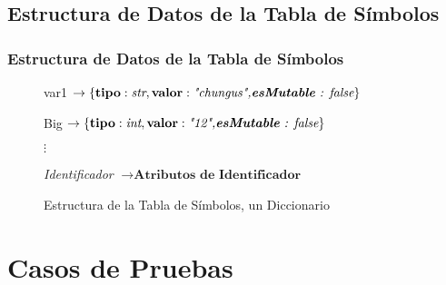 \documentclass[14pt, aspectratio=169]{beamer}
\begin{document}
\subsection{Estructura de Datos de la Tabla de Símbolos}

\begin{frame}
    \frametitle{Estructura de Datos de la Tabla de Símbolos}
    \begin{figure}[H]
        \begin{mdframed}
            \textnormal{var1} $\rightarrow \left\{\textbf{tipo}: \textit{str},\textbf{valor}:\textit{"chungus",\textbf{esMutable} : false}\right\}$

            \textnormal{Big} $\rightarrow \left\{\textbf{tipo}: \textit{int},\textbf{valor}:\textit{"12",\textbf{esMutable} : false}\right\}$
            \begin{center}
                $\vdots$
            \end{center}

            \textit{Identificador}  $\rightarrow \textbf{Atributos de Identificador}$
        \end{mdframed}
        \label{fig: symbolTableStruct}
        \caption{Estructura de la Tabla de Símbolos, un Diccionario}
    \end{figure}
\end{frame}

\section{Casos de Pruebas}
\end{document}
